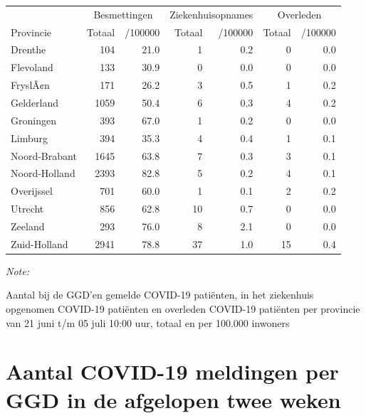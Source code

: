 \documentclass[
  english,
  man,floatsintext]{apa6}
\begin{document}
\begin{table}
\centering
\begin{threeparttable}
\begin{tabular}{lrrrrrr}
\toprule
\multicolumn{1}{c}{ } & \multicolumn{2}{c}{Besmettingen} & \multicolumn{2}{c}{Ziekenhuisopnames} & \multicolumn{2}{c}{Overleden} \\
\cmidrule(l{3pt}r{3pt}){2-3} \cmidrule(l{3pt}r{3pt}){4-5} \cmidrule(l{3pt}r{3pt}){6-7}
Provincie & Totaal & /100000 & Totaal & /100000 & Totaal & /100000\\
\midrule
Drenthe & 104 & 21.0 & 1 & 0.2 & 0 & 0.0\\
Flevoland & 133 & 30.9 & 0 & 0.0 & 0 & 0.0\\
FryslÃ¢n & 171 & 26.2 & 3 & 0.5 & 1 & 0.2\\
Gelderland & 1059 & 50.4 & 6 & 0.3 & 4 & 0.2\\
Groningen & 393 & 67.0 & 1 & 0.2 & 0 & 0.0\\
Limburg & 394 & 35.3 & 4 & 0.4 & 1 & 0.1\\
Noord-Brabant & 1645 & 63.8 & 7 & 0.3 & 3 & 0.1\\
Noord-Holland & 2393 & 82.8 & 5 & 0.2 & 4 & 0.1\\
Overijssel & 701 & 60.0 & 1 & 0.1 & 2 & 0.2\\
Utrecht & 856 & 62.8 & 10 & 0.7 & 0 & 0.0\\
Zeeland & 293 & 76.0 & 8 & 2.1 & 0 & 0.0\\
Zuid-Holland & 2941 & 78.8 & 37 & 1.0 & 15 & 0.4\\
\bottomrule
\end{tabular}
\begin{tablenotes}
\item \textit{Note: } 
\item Aantal bij de GGD’en gemelde COVID-19 patiënten, in het ziekenhuis opgenomen COVID-19 patiënten en overleden COVID-19 patiënten per provincie van 21 juni t/m 05 juli 10:00 uur, totaal en per 100.000 inwoners
\end{tablenotes}
\end{threeparttable}
\end{table}

\newpage

\hypertarget{aantal-covid-19-meldingen-per-ggd-in-de-afgelopen-twee-weken}{%
\section{Aantal COVID-19 meldingen per GGD in de afgelopen twee weken}\label{aantal-covid-19-meldingen-per-ggd-in-de-afgelopen-twee-weken}}
\end{document}
